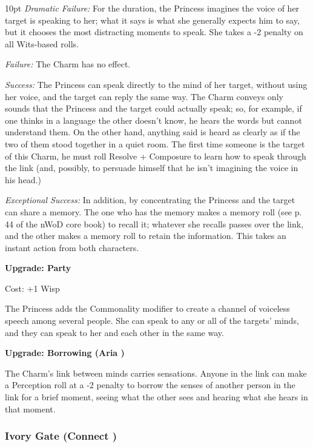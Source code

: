 \begin{myindentpar}{10pt}    \emph{Dramatic Failure:} For the duration, the Princess imagines the voice of her target is speaking to her; what it says is what she generally expects him to say, but it chooses the most distracting moments to speak. She takes a -2 penalty on all Wits-based rolls.
    
	\emph{Failure:} The Charm has no effect.
    
	\emph{Success:} The Princess can speak directly to the mind of her target, without using her voice, and the target can reply the same way. The Charm conveys only sounds that the Princess and the target could actually speak; so, for example, if one thinks in a language the other doesn't know, he hears the words but cannot understand them. On the other hand, anything said is heard as clearly as if the two of them stood together in a quiet room. The first time someone is the target of this Charm, he must roll Resolve + Composure to learn how to speak through the link (and, possibly, to persuade himself that he isn't imagining the voice in his head.)
    
	\emph{Exceptional Success:} In addition, by concentrating the Princess and the target can share a memory. The one who has the memory makes a memory roll (see p. 44 of the nWoD core book) to recall it; whatever she recalls passes over the link, and the other makes a memory roll to retain the information. This takes an instant action from both characters.

\textbf{Upgrade: Party}

\noindent Cost: +1 Wisp

The Princess adds the Commonality modifier to create a channel of voiceless speech among several people. She can speak to any or all of the targets' minds, and they can speak to her and each other in the same way. 

\textbf{Upgrade: Borrowing (Aria \textbullet\textbullet)}

The Charm's link between minds carries sensations. Anyone in the link can make a Perception roll at a -2 penalty to borrow the senses of another person in the link for a brief moment, seeing what the other sees and hearing what she hears in that moment.\end{myindentpar}

\subsubsection*{Ivory Gate (Connect \textbullet\textbullet\textbullet)}

